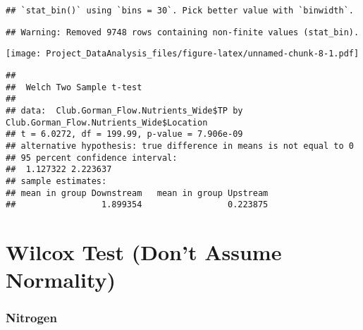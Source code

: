 \documentclass[]{article}
\newenvironment{Shaded}{\begin{snugshade}}{\end{snugshade}}
\newcommand{\DataTypeTok}[1]{\textcolor[rgb]{0.13,0.29,0.53}{#1}}
\newcommand{\DecValTok}[1]{\textcolor[rgb]{0.00,0.00,0.81}{#1}}
\newcommand{\KeywordTok}[1]{\textcolor[rgb]{0.13,0.29,0.53}{\textbf{#1}}}
\newcommand{\NormalTok}[1]{#1}
\newcommand{\OperatorTok}[1]{\textcolor[rgb]{0.81,0.36,0.00}{\textbf{#1}}}
\newcommand{\StringTok}[1]{\textcolor[rgb]{0.31,0.60,0.02}{#1}}
\begin{document}
\begin{verbatim}
## `stat_bin()` using `bins = 30`. Pick better value with `binwidth`.
\end{verbatim}

\begin{verbatim}
## Warning: Removed 9748 rows containing non-finite values (stat_bin).
\end{verbatim}

\texttt{[image: Project\_DataAnalysis\_files/figure-latex/unnamed-chunk-8-1.pdf]}

\begin{Shaded}
\end{Shaded}

\begin{verbatim}
## 
##  Welch Two Sample t-test
## 
## data:  Club.Gorman_Flow.Nutrients_Wide$TP by Club.Gorman_Flow.Nutrients_Wide$Location
## t = 6.0272, df = 199.99, p-value = 7.906e-09
## alternative hypothesis: true difference in means is not equal to 0
## 95 percent confidence interval:
##  1.127322 2.223637
## sample estimates:
## mean in group Downstream   mean in group Upstream 
##                 1.899354                 0.223875
\end{verbatim}

\hypertarget{wilcox-test-dont-assume-normality}{%
\section{Wilcox Test (Don't Assume
Normality)}\label{wilcox-test-dont-assume-normality}}

\hypertarget{nitrogen-1}{%
\subsubsection{Nitrogen}\label{nitrogen-1}}

\begin{Shaded}
\end{Shaded}
\end{document}
